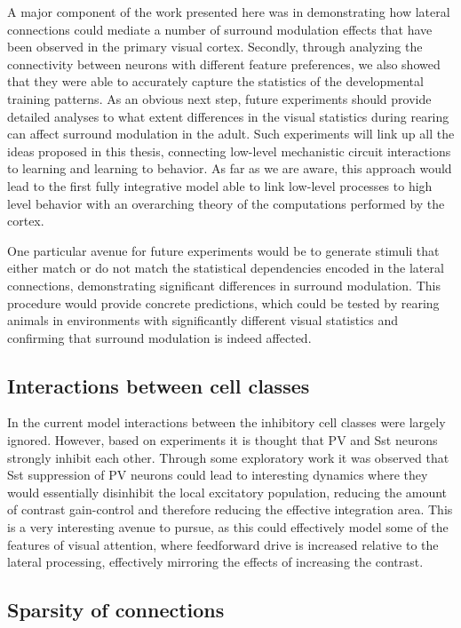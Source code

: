A major component of the work presented here was in demonstrating how
lateral connections could mediate a number of surround modulation
effects that have been observed in the primary visual
cortex. Secondly, through analyzing the connectivity between neurons
with different feature preferences, we also showed that they were able
to accurately capture the statistics of the developmental training
patterns. As an obvious next step, future experiments should provide
detailed analyses to what extent differences in the visual statistics
during rearing can affect surround modulation in the adult. Such
experiments will link up all the ideas proposed in this thesis,
connecting low-level mechanistic circuit interactions to learning and
learning to behavior. As far as we are aware, this approach would lead
to the first fully integrative model able to link low-level processes
to high level behavior with an overarching theory of the computations
performed by the cortex.

One particular avenue for future experiments would be to generate
stimuli that either match or do not match the statistical
dependencies encoded in the lateral connections, demonstrating
significant differences in surround modulation. This procedure would provide
concrete predictions, which could be tested by rearing animals in
environments with significantly different visual statistics and
confirming that surround modulation is indeed affected.

\subsection{Interactions between cell classes}

In the current model interactions between the inhibitory cell classes
were largely ignored. However, based on experiments it is thought that
PV and Sst neurons strongly inhibit each other. Through some
exploratory work it was observed that Sst suppression of PV neurons
could lead to interesting dynamics where they would essentially
disinhibit the local excitatory population, reducing the amount of
contrast gain-control and therefore reducing the effective integration
area. This is a very interesting avenue to pursue, as this could
effectively model some of the features of visual attention, where
feedforward drive is increased relative to the lateral processing,
effectively mirroring the effects of increasing the contrast.

\subsection{Sparsity of connections}

